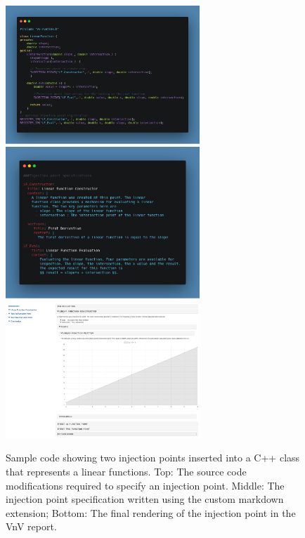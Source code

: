 \begin{figure}
 \centering
 \includegraphics[width=0.65\textwidth]{./narrative/figures/code-example.png}
 \includegraphics[width=0.65\textwidth]{./narrative/figures/template-example.png} 
 \includegraphics[width=0.65\textwidth]{./narrative/figures/render-example.PNG}
 \caption{Sample code showing two injection points inserted into a C++ class that represents a linear functions. Top: The source code modifications required to specify an injection point. Middle: The injection point specification written using the custom markdown extension; Bottom: The final rendering of the injection point in the VnV report. \label{fig:example}}
\end{figure}



